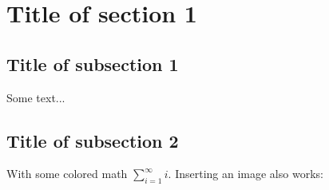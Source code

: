 \section{Title of section 1}
\subsection*{Title of subsection 1}
Some text...
\subsection*{Title of subsection 2}
With some colored math $\sum_{i=1}^\infty i$.
Inserting an image also works:\\
